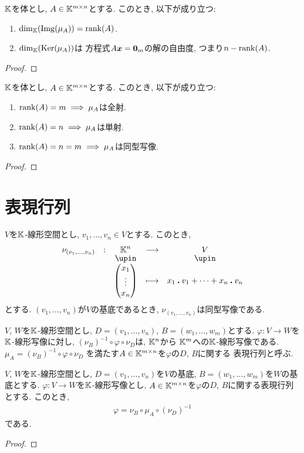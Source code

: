 \begin{cor}
  $\mathbb{K}$を体とし,
  $A\in\mathbb{K}^{m\times n}$とする.
  このとき,
  以下が成り立つ:
  \begin{enumerate}
  \item $\dim_{\mathbb{K}}(\operatorname{Img}(\mu_A))=\operatorname{rank}(A)$.
  \item $\dim_{\mathbb{K}}(\operatorname{Ker}(\mu_A))$は
    方程式$A\boldsymbol{x}=\boldsymbol{0}_m$の解の自由度, つまり$n-\operatorname{rank}(A)$.
  \end{enumerate}
\end{cor}
\begin{proof}\end{proof}

\begin{cor}
  $\mathbb{K}$を体とし,
  $A\in\mathbb{K}^{m\times n}$とする.
  このとき,
  以下が成り立つ:
  \begin{enumerate}
  \item $\operatorname{rank}(A)=m \implies \mu_A$は全射.
  \item $\operatorname{rank}(A)=n \implies \mu_A$は単射.
  \item $\operatorname{rank}(A)=n=m\implies \mu_A$は同型写像.
  \end{enumerate}
\end{cor}
\begin{proof}\end{proof}



\section{表現行列}
$V$を$\mathbb{K}$-線形空間とし, $v_1,\ldots,v_n\in V$とする.
このとき,
\begin{align*}
    \shazo{\nu_{(v_1,\ldots,v_n)}}{\KK^n}{V}
          {\begin{pmatrix}x_1\\\vdots\\x_n\end{pmatrix}}
          {x_1\act v_1+\cdots+x_n\act v_n}
\end{align*}
とする.
$(v_1,\ldots,v_n)$が$V$の基底であるとき,
$\nu_{(v_1,\ldots,v_n)}$は同型写像である.

\begin{definition}
  $V$, $W$を$\mathbb{K}$-線形空間とし,
  $D=(v_1,\ldots,v_n)$,
  $B=(w_1,\ldots,w_m)$とする.
  $\varphi\colon V\to W$を$\mathbb{K}$-線形写像に対し,
  $(\nu_B)^{-1}\circ \varphi\circ \nu_D$は,
  $\mathbb{K}^n$から $\mathbb{K}^m$への$\mathbb{K}$-線形写像である.
  $\mu_A=(\nu_B)^{-1}\circ \varphi\circ \nu_D$
  を満たす$A\in\mathbb{K}^{m\times n}$を$\varphi$の$D$, $B$に関する
  表現行列と呼ぶ.
\end{definition}
\begin{prop}
  $V$, $W$を$\mathbb{K}$-線形空間とし,
  $D=(v_1,\ldots,v_n)$を$V$の基底,
  $B=(w_1,\ldots,w_m)$を$W$の基底とする.
  $\varphi\colon V\to W$を$\mathbb{K}$-線形写像とし,
  $A\in\mathbb{K}^{m\times n}$を$\varphi$の$D$, $B$に関する表現行列とする.
このとき,
\begin{align*}
  \varphi=\nu_B\circ \mu_A\circ (\nu_{D})^{-1}
\end{align*}
である.
\end{prop}
\begin{proof}\end{proof}

